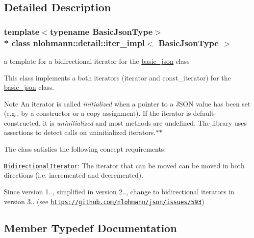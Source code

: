 \subsection{Detailed Description}
\subsubsection*{template$<$typename Basic\+Json\+Type$>$\\*
class nlohmann\+::detail\+::iter\+\_\+impl$<$ Basic\+Json\+Type $>$}

a template for a bidirectional iterator for the \hyperlink{classnlohmann_1_1basic__json}{basic\+\_\+json} class 

This class implements a both iterators (iterator and const\+\_\+iterator) for the \hyperlink{classnlohmann_1_1basic__json}{basic\+\_\+json} class.

\begin{DoxyNote}{Note}
An iterator is called {\itshape initialized} when a pointer to a J\+S\+ON value has been set (e.\+g., by a constructor or a copy assignment). If the iterator is default-\/constructed, it is {\itshape uninitialized} and most methods are undefined. The library uses assertions to detect calls on uninitialized iterators.$\ast$$\ast$
\end{DoxyNote}
The class satisfies the following concept requirements\+:
\begin{DoxyItemize}
\item \href{http://en.cppreference.com/w/cpp/concept/BidirectionalIterator}{\tt Bidirectional\+Iterator}\+: The iterator that can be moved can be moved in both directions (i.\+e. incremented and decremented).
\end{DoxyItemize}

\begin{DoxySince}{Since}
version 1.., simplified in version 2.., change to bidirectional iterators in version 3.. (see \href{https://github.com/nlohmann/json/issues/593}{\tt https\+://github.\+com/nlohmann/json/issues/593}) 
\end{DoxySince}


\subsection{Member Typedef Documentation}
